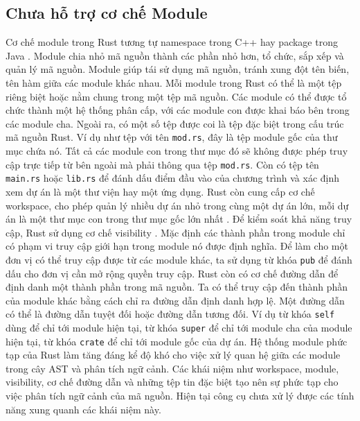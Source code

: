 \subsection{Chưa hỗ trợ cơ chế Module}

Cơ chế module trong Rust tương tự namespace trong C++ hay package trong Java \cite{rustlangManagingGrowing}.
Module chia nhỏ mã nguồn thành các phần nhỏ hơn, tổ chức, sắp xếp và quản lý mã nguồn.
Module giúp tái sử dụng mã nguồn, tránh xung đột tên biến, tên hàm giữa các module khác nhau.
Mỗi module trong Rust có thể là một tệp riêng biệt hoặc nằm chung trong một tệp mã nguồn.
Các module có thể được tổ chức thành một hệ thống phân cấp, với các module con được khai báo bên trong các module cha.
Ngoài ra, có một số tệp được coi là tệp đặc biệt trong cấu trúc mã nguồn Rust.
Ví dụ như tệp với tên \texttt{mod.rs}, đây là tệp module gốc của thư mục chứa nó.
Tất cả các module con trong thư mục đó sẽ không được phép truy cập trực tiếp từ bên ngoài mà phải thông qua tệp \texttt{mod.rs}.
Còn có tệp tên \texttt{main.rs} hoặc \texttt{lib.rs} để đánh dấu điểm đầu vào của chương trình và xác định xem dự án là một thư viện hay một ứng dụng.
Rust còn cung cấp cơ chế workspace, cho phép quản lý nhiều dự án nhỏ trong cùng một dự án lớn, mỗi dự án là một thư mục con trong thư mục gốc lớn nhất \cite{rustlangCargoWorkspaces}.
Để kiểm soát khả năng truy cập, Rust sử dụng cơ chế visibility \cite{rustlangVisibilityPrivacy}.
Mặc định các thành phần trong module chỉ có phạm vi truy cập giới hạn trong module nó được định nghĩa.
Để làm cho một đơn vị có thể truy cập được từ các module khác, ta sử dụng từ khóa \texttt{pub} để đánh dấu cho đơn vị cần mở rộng quyền truy cập.
Rust còn có cơ chế đường dẫn để định danh một thành phần trong mã nguồn.
Ta có thể truy cập đến thành phần của module khác bằng cách chỉ ra đường dẫn định danh hợp lệ.
Một đường dẫn có thể là đường dẫn tuyệt đối hoặc đường dẫn tương đối.
Ví dụ từ khóa \texttt{self} dùng để chỉ tới module hiện tại, từ khóa \texttt{super} để chỉ tới module cha của module hiện tại, từ khóa \texttt{crate} để chỉ tới module gốc của dự án.
Hệ thống module phức tạp của Rust làm tăng đáng kể độ khó cho việc xử lý quan hệ giữa các module trong cây AST và phân tích ngữ cảnh.
Các khái niệm như workspace, module, visibility, cơ chế đường dẫn và những tệp tin đặc biệt tạo nên sự phức tạp cho việc phân tích ngữ cảnh của mã nguồn.
Hiện tại công cụ chưa xử lý được các tính năng xung quanh các khái niệm này.


